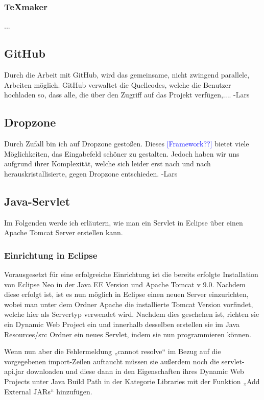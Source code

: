 \documentclass[12pt,a4paper,bibliography=totocnumbered,listof=totocnumbered]{scrartcl}
\begin{document}
\subsubsection{TeXmaker}
...

\subsection{GitHub}
Durch die Arbeit mit GitHub, wird das gemeinsame, nicht zwingend parallele, Arbeiten möglich.
GitHub verwaltet die Quellcodes, welche die Benutzer hochladen so, dass
alle, die über den Zugriff auf das Projekt verfügen,.... -Lars

\subsection{Dropzone}
Durch Zufall bin ich auf Dropzone gestoßen.
Dieses \textcolor{blue}{[Framework??]} bietet viele Möglichkeiten, 
das Eingabefeld schöner zu gestalten.
Jedoch haben wir uns aufgrund ihrer Komplexität, welche sich leider erst
nach und nach herauskristallisierte, gegen Dropzone entschieden. -Lars

\subsection{Java-Servlet}
Im Folgenden werde ich erläutern, wie man ein Servlet in Eclipse über einen Apache Tomcat Server erstellen kann.

\subsubsection{Einrichtung in Eclipse}
Vorausgesetzt für eine erfolgreiche Einrichtung ist die bereits erfolgte Installation von Eclipse Neo in der Java EE Version und Apache Tomcat v 9.0. 
Nachdem  diese erfolgt ist, ist es nun möglich in Eclipse einen neuen Server einzurichten, wobei man unter dem Ordner Apache die installierte Tomcat Version vorfindet, welche hier  als Servertyp verwendet wird.
Nachdem dies geschehen ist, richten sie ein Dynamic Web Project ein und innerhalb desselben erstellen sie im Java Resources/src  Ordner ein neues Servlet, indem sie nun programmieren können.

Wenn nun aber die Fehlermeldung  „cannot resolve“ im Bezug auf die vorgegebenen import-Zeilen auftaucht müssen sie außerdem noch die servlet-api.jar downloaden und diese dann in den Eigenschaften ihres Dynamic Web Projects unter Java Build Path in der Kategorie Libraries mit der Funktion „Add External JARs“ hinzufügen. 
\end{document}
